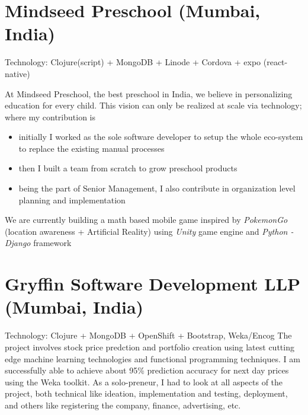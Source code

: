 \documentclass[11pt,a4paper,sans]{moderncv} %
\begin{document}
\section{Mindseed Preschool (Mumbai, India)}
         {}{Technology: Clojure(script) + MongoDB + Linode + Cordova + expo (react-native)}
         {At Mindseed Preschool, the best preschool in India, we believe in personalizing education for every child. This vision can only be realized at scale via technology; where my contribution is
           \begin{itemize}
           \item initially I worked as the sole software developer to setup the whole eco-system to replace the existing manual processes
           \item then I built a team from scratch to grow preschool products
           \item being the part of Senior Management, I also contribute in organization level planning and implementation
           \end{itemize}
         We are currently building a math based mobile game inspired by \textit{PokemonGo} (location awareness + Artificial Reality) using \textit{Unity} game engine and \textit{Python - Django} framework}

\section{Gryffin Software Development LLP (Mumbai, India)}
         {}{Technology: Clojure + MongoDB + OpenShift + Bootstrap, Weka/Encog}
         {The project involves stock price predction and portfolio creation using latest cutting edge machine learning technologies and functional programming techniques. I am successfully able to achieve about 95\% prediction accuracy for next day prices using the Weka toolkit. As a solo-preneur, I had to look at all aspects of the project, both technical like ideation, implementation and testing, deployment, and others like registering the company, finance, advertising, etc.}
\end{document}
